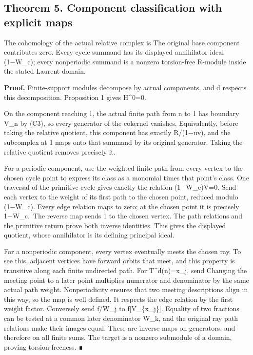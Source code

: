 \subsection{Theorem 5. Component classification with explicit maps}

The cohomology of the actual relative complex is
 The original base
component contributes zero. Every cycle summand has its displayed
annihilator ideal (1−W\_c); every nonperiodic summand is a nonzero
torsion-free R-module inside the stated Laurent domain.

\textbf{Proof.} Finite-support modules decompose by actual components,
and d respects this decomposition. Proposition 1 gives H\^{}0=0.

On the component reaching 1, the actual finite path from n to 1 has
boundary V\_n by (C3), so every generator of the cokernel vanishes.
Equivalently, before taking the relative quotient, this component has
exactly R/(1−uv), and the subcomplex at 1 maps onto that summand by its
original generator. Taking the relative quotient removes precisely it.

For a periodic component, use the weighted finite path from every vertex
to the chosen cycle point to express its class as a monomial times that
point's class. One traversal of the primitive cycle gives exactly the
relation (1−W\_c)V=0. Send each vertex to the weight of its first path
to the chosen point, reduced modulo (1−W\_c). Every edge relation maps
to zero; at the chosen point it is precisely 1−W\_c.~The reverse map
sends 1 to the chosen vertex. The path relations and the primitive
return prove both inverse identities. This gives the displayed quotient,
whose annihilator is its defining principal ideal.

For a nonperiodic component, every vertex eventually meets the chosen
ray. To see this, adjacent vertices have forward orbits that meet, and
this property is transitive along each finite undirected path. For
T\^{}d(n)=x\_j, send
Changing the meeting point to a later point multiplies numerator and
denominator by the same actual path weight. Nonperiodicity ensures that
two meeting descriptions align in this way, so the map is well defined.
It respects the edge relation by the first weight factor. Conversely
send f/W\_j to f{[}V\_\{x\_j\}{]}. Equality of two fractions can be
tested at a common later denominator W\_k, and the original ray path
relations make their images equal. These are inverse maps on generators,
and therefore on all finite sums. The target is a nonzero submodule of a
domain, proving torsion-freeness. ∎

